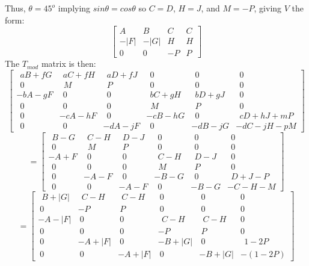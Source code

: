 Thus, $\theta = 45^o$ implying $sin\theta = cos\theta$ so $C=D$, $H=J$, and
$M=-P$, giving $V$ the form:
\begin{equation*}
\left[
\begin{array}{rrrr}
  A\;\; &   B\;\; &  C &  C \\
-|F|    & -|G|    &  H &  H \\
  0~    &   0~    & -P &  P
\end{array}
\right]
\end{equation*}
The $T_{mod}$ matrix is then:
\begin{equation*}
\begin{bmatrix}
~~aB\!+\!fG & ~~aC\!+\!fH & ~~aD\!+\!fJ &   ~~0   &   ~~0   &     ~~0    \\
  ~~0   &  ~\;M   &   ~~P   &   ~~0   &   ~~0   &     ~~0    \\
 -bA\!-\!gF &   ~~0   &   ~~0   & ~~bC\!+\!gH & ~~bD\!+\!gJ &     ~~0    \\
  ~~0   &   ~~0   &   ~~0   &  ~\;M   &   ~~P   &     ~~0    \\
  ~~0   &  -cA\!-\!hF &   ~~0   &  -cB\!-\!hG &   ~~0   & ~~cD\!+\!hJ\!+\!mP \\
  ~~0   &   ~~0   &  -dA\!-\!jF &   ~~0   &  -dB\!-\!jG &  -dC\!-\!jH\!-\!pM 
\end{bmatrix}
\end{equation*}
\begin{equation*}
=
\begin{bmatrix}
~~B-G & ~~C-H & ~~D-J &  ~~0  &  ~~0  &  ~~0    \\
 ~~0  & ~\;M  &  ~~P  &  ~~0  &  ~~0  &  ~~0    \\
 -A+F &  ~~0  &  ~~0  & ~~C-H & ~~D-J &  ~~0    \\
 ~~0  &  ~~0  &  ~~0  & ~\;M  &  ~~P  &  ~~0    \\
 ~~0  &  -A-F &  ~~0  &  -B-G &  ~~0  & ~~D+J-P \\
 ~~0  &  ~~0  &  -A-F &  ~~0  &  -B-G &  -C-H-M
\end{bmatrix}
\end{equation*}
\begin{equation*}
=
\begin{bmatrix}
~~B+|G| & ~~C-H   & ~~C-H   &   ~0    &   ~0    &      0      \\
  ~0    & -\!P    &   ~P    &   ~0    &   ~0    &      0      \\
 -A-|F| &   ~0    &   ~0    & ~~C-H   & ~~C-H   &      0      \\
  ~0    &   ~0    &   ~0    & -\!P    &   ~P    &      0      \\
  ~0    &  -A+|F| &   ~0    &  -B+|G| &   ~0    & ~~1\!-\!2P  \\
  ~0    &   ~0    &  -A+|F| &   ~0    &  -B+|G| & -(1\!-\!2P)
\end{bmatrix}
\end{equation*}
